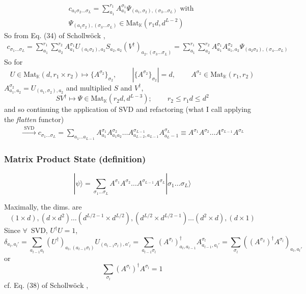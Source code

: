 \[
\begin{gathered}
c_{a_1\sigma_2 \dots \sigma_L } = \sum_{a_1}^{r_1} A_{a_1}^{\sigma_1} \Psi_{(a_1,\sigma_2),(\sigma_3\dots \sigma_L)} \text{ with } \\
\Psi_{(a_1\sigma_2),(\sigma_3\dots \sigma_L)}\in \text{Mat}_{\mathbb{K}}(r_1d,d^{L-2})
\end{gathered}
\]
So from Eq. (34) of  Schollw\"{o}ck \cite{agat:Scho2010},
\begin{equation}
\begin{gathered}
	c_{\sigma_1 \dots \sigma_L} = \sum_{a_1}^{r_1} \sum_{a_2}^{r_2} A_{a_1}^{\sigma_1} U_{ (a_1\sigma_2) , a_2} S_{a_2,a_2} (V^{\dag})_{a_2, (\sigma_3\dots \sigma_L)} = \sum_{a_1}^{r_1} \sum_{a_2}^{r_2} A_{a_1}^{\sigma_1} A_{a_1,a_2}^{\sigma_2} \Psi_{(a_2\sigma_3), (\sigma_4\dots \sigma_L)}
\end{gathered}
\end{equation}
So for 
\[
U\in \text{Mat}_{\mathbb{K}}(d,r_1\times r_2) \mapsto \lbrace A^{\sigma_2} \rbrace_{\sigma_2}, \qquad \, | \lbrace A^{\sigma_2} \rbrace_{\sigma_2} | = d , \qquad \, A^{\sigma_2} \in \text{Mat}_{\mathbb{K}}(r_1,r_2)
\]
$A^{\sigma_2}_{a_1,a_2} = U_{(a_1,\sigma_2),a_2}$ and multiplied $S$ and $V^{\dag}$, 
\[
SV^{\dag} \mapsto \Psi \in \text{Mat}_{\mathbb{K}}(r_2d, d^{L-3}); \qquad \, r_2 \leq r_1 d \leq d^2
\]
and so continuing the application of SVD and refactoring (what I call applying the \emph{flatten} functor)
\[
\begin{gathered}
\xrightarrow{ \text{ SVD } } c_{\sigma_1 \dots \sigma_L} = \sum_{a_1 \dots a_{L-1}} A^{\sigma_1}_{a_1} A^{\sigma_2}_{a_1 a_2} \dots A^{\sigma_{L-1}}_{a_{L-2}, a_{L-1} } A^{\sigma_L }_{a_L-1 } \equiv A^{\sigma_1} A^{\sigma_2} \dots A^{\sigma_{L-1}} A^{\sigma_L}
\end{gathered}
\]

\subsubsection{Matrix Product State (definition)}

\begin{definition}
\begin{equation}
|\psi \rangle = \sum_{\sigma_1 \dots \sigma_L} A^{\sigma_1}A^{\sigma_2} \dots A^{\sigma_{L-1}} A^{\sigma_L} | \sigma_1 \dots \sigma_L \rangle
\end{equation}
\end{definition}

Maximally, the dims. are 
\[
(1\times d), (d\times d^2) \dots (d^{L/2-1} \times d^{L/2} ), (d^{L/2} \times d^{L/2-1} ) \dots (d^2 \times d), (d\times 1)
\]
Since $\forall \, $ SVD, $U^{\dag} U=1$, 
\[
\delta_{a_l , a_l'} = \sum_{a_{l-1} a_l} (U^{\dag})_{a_l,(a_{l-1} \sigma_l)} U_{(a_{l-1} \sigma_l),a'_l } = \sum_{a_{l-1} \sigma_l} (A^{\sigma_l})^{\dag}_{a_l,a_{l-1}} A^{\sigma_l}_{a_{l-1},a_l'} = \sum_{\sigma_l} ( (A^{\sigma_2})^{\dag} A^{\sigma_l} )_{a_l,a_l'}
\]
or 
\begin{equation}
	\sum_{\sigma_l} (A^{\sigma_l})^{\dag} A^{\sigma_l} = 1
\end{equation}
cf. Eq. (38) of  Schollw\"{o}ck \cite{agat:Scho2010},

